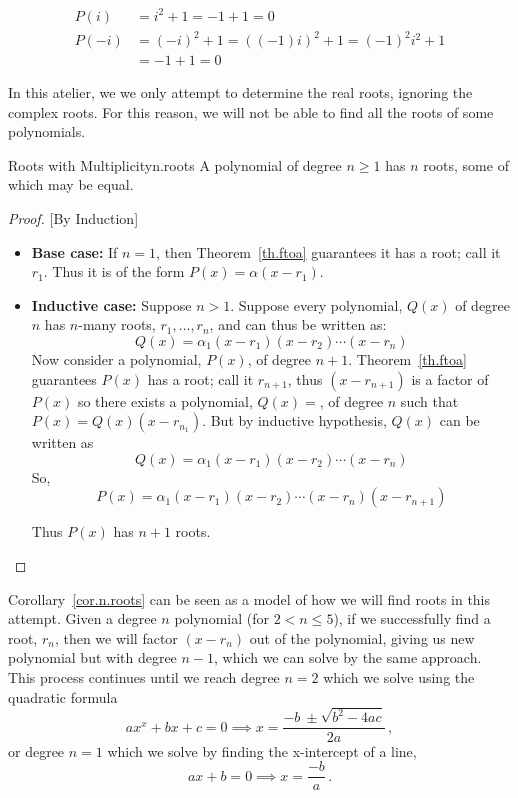 \begin{align*}
  P(i) &= i^2 + 1 = -1 + 1 = 0\\[3pt]
  P(-i) &= (-i)^2 + 1 = ((-1)i)^2 + 1 = (-1)^2i^2 + 1 \\
  &= -1 + 1 = 0
\end{align*}

In this atelier, we we only attempt to determine the real roots, ignoring the complex roots.
For this reason, we will not be able to find all the roots of some polynomials.

\begin{corollary}{Roots with Multiplicity}{n.roots}
  A polynomial of degree $n\ge 1$ has $n$ roots, some of which may be equal.
\end{corollary}
\begin{proof}

  [By Induction]
  
  \begin{itemize}
    
  \item \textbf{Base case:} If $n=1$, then Theorem~\ref{th.ftoa}
    guarantees it has a root; call it $r_1$.  Thus it is of the form
    $P(x)=\alpha (x-r_1)$.
  \item \textbf{Inductive case:} Suppose $n>1$.  Suppose every polynomial, $Q(x)$ of degree
    $n$ has $n$-many roots, $r_1,\ldots,r_n$, and can thus be written as:
    \[Q(x) = \alpha_1 (x - r_1) (x - r_2) \cdots (x - r_n)\]
    Now consider a polynomial, $P(x)$, of
    degree $n+1$.  Theorem~\ref{th.ftoa} guarantees $P(x)$ has a root;
    call it $r_{n+1}$, thus $(x-r_{n+1})$ is a factor of $P(x)$ so there
    exists a polynomial, $Q(x)=$, of degree $n$ such that
    $P(x) =  Q(x) (x-r_{n_1})$.
    But by inductive hypothesis, $Q(x)$ can be written
    as \[Q(x) = \alpha_1 (x - r_1) (x - r_2) \cdots (x - r_n)\]
    So, \[P(x) = \alpha_1 (x - r_1) (x - r_2) \cdots (x - r_n) (x-r_{n+1})\]

    Thus $P(x)$ has $n+1$ roots.
  \end{itemize}
\end{proof}

Corollary~\ref{cor.n.roots} can be seen as a model of how we will find
roots in this attempt.  Given a degree $n$ polynomial (for $2<n\leq
5$), if we successfully find a root, $r_n$, then we will factor
$(x-r_n)$ out of the polynomial, giving us new polynomial but with
degree $n-1$, which we can solve by the same approach.  This process
continues until we reach degree $n=2$ which we solve using the
quadratic formula
\[ a x^x + b x + c = 0 \implies x = \frac{-b~ \pm \sqrt{b^2 - 4a c}}{2a}\,,\] or
degree $n=1$ which we solve by finding the x-intercept of a line,
\[ a x + b = 0 \implies x=\frac{-b}{a}\,.\]
